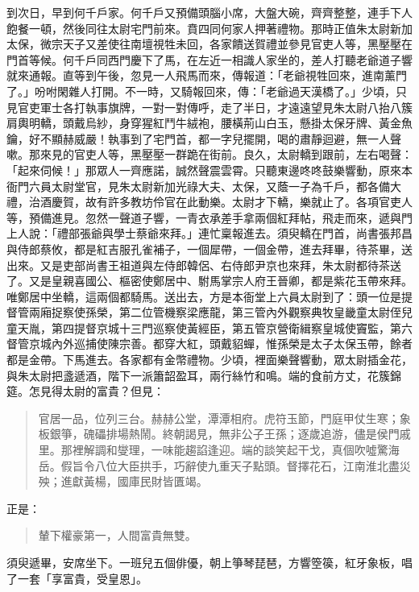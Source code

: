 到次日，早到何千戶家。何千戶又預備頭腦小席，大盤大碗，齊齊整整，連手下人飽餐一頓，然後同往太尉宅門前來。賁四同何家人押著禮物。那時正值朱太尉新加太保，微宗天子又差使往南壇視牲未回，各家饋送賀禮並參見官吏人等，黑壓壓在門首等候。何千戶同西門慶下了馬，在左近一相識人家坐的，差人打聽老爺道子響就來通報。直等到午後，忽見一人飛馬而來，傳報道：「老爺視牲回來，進南薰門了。」吩咐閑雜人打開。不一時，又騎報回來，傳：「老爺過天漢橋了。」少頃，只見官吏軍士各打執事旗牌，一對一對傳呼，走了半日，才遠遠望見朱太尉八抬八簇肩輿明轎，頭戴烏紗，身穿猩紅鬥牛絨袍，腰橫荊山白玉，懸掛太保牙牌、黃金魚鑰，好不顯赫威嚴！執事到了宅門首，都一字兒擺開，喝的肅靜迴避，無一人聲嗽。那來見的官吏人等，黑壓壓一群跪在街前。良久，太尉轎到跟前，左右喝聲：「起來伺候！」那眾人一齊應諾，誠然聲震雲霄。只聽東邊咚咚鼓樂響動，原來本衙門六員太尉堂官，見朱太尉新加光祿大夫、太保，又蔭一子為千戶，都各備大禮，治酒慶賀，故有許多教坊伶官在此動樂。太尉才下轎，樂就止了。各項官吏人等，預備進見。忽然一聲道子響，一青衣承差手拿兩個紅拜帖，飛走而來，遞與門上人說：「禮部張爺與學士蔡爺來拜。」連忙稟報進去。須臾轎在門首，尚書張邦昌與侍郎蔡攸，都是紅吉服孔雀補子，一個犀帶，一個金帶，進去拜畢，待茶畢，送出來。又是吏部尚書王祖道與左侍郎韓侶、右侍郎尹京也來拜，朱太尉都待茶送了。又是皇親喜國公、樞密使鄭居中、駙馬掌宗人府王晉卿，都是紫花玉帶來拜。唯鄭居中坐轎，這兩個都騎馬。送出去，方是本衙堂上六員太尉到了：頭一位是提督管兩廂捉察使孫榮，第二位管機察梁應龍，第三管內外觀察典牧皇畿童太尉侄兒童天胤，第四提督京城十三門巡察使黃經臣，第五管京營衛緝察皇城使竇監，第六督管京城內外巡捕使陳宗善。都穿大紅，頭戴貂蟬，惟孫榮是太子太保玉帶，餘者都是金帶。下馬進去。各家都有金幣禮物。少頃，裡面樂聲響動，眾太尉插金花，與朱太尉把盞遞酒，階下一派簫韶盈耳，兩行絲竹和鳴。端的食前方丈，花簇錦筵。怎見得太尉的富貴？但見：
\begin{quote}
官居一品，位列三台。赫赫公堂，潭潭相府。虎符玉節，門庭甲仗生寒；象板銀箏，磈礧排場熱鬧。終朝謁見，無非公子王孫；逐歲追游，儘是侯門戚里。那裡解調和燮理，一味能趨諂逢迎。端的談笑起干戈，真個吹噓驚海岳。假旨令八位大臣拱手，巧辭使九重天子點頭。督擇花石，江南淮北盡災殃；進獻黃楊，國庫民財皆匱竭。
\end{quote}
正是：
\begin{quote}
輦下權豪第一，人間富貴無雙。
\end{quote}

須臾遞畢，安席坐下。一班兒五個俳優，朝上箏琴琵琶，方響箜篌，紅牙象板，唱了一套「享富貴，受皇恩」。

